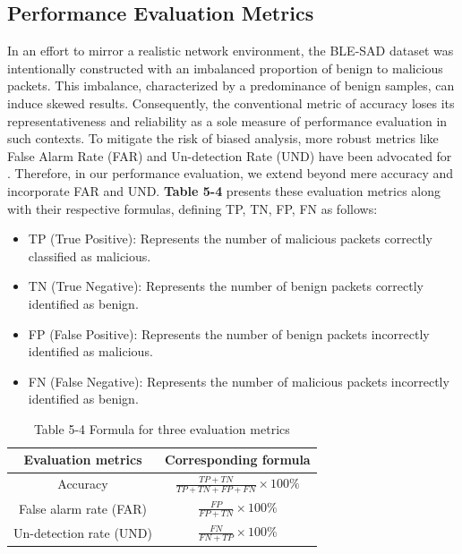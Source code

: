 

\subsection{Performance Evaluation Metrics}
\noindent In an effort to mirror a realistic network environment, the BLE-SAD dataset was intentionally constructed with an imbalanced proportion of benign to malicious packets. This imbalance, characterized by a predominance of benign samples, can induce skewed results. Consequently, the conventional metric of accuracy loses its representativeness and reliability as a sole measure of performance evaluation in such contexts. To mitigate the risk of biased analysis, more robust metrics like False Alarm Rate (FAR) and Un-detection Rate (UND) have been advocated for \cite{lahmadi2020mitm}. Therefore, in our performance evaluation, we extend beyond mere accuracy and incorporate FAR and UND. \textbf{Table 5-4} presents these evaluation metrics along with their respective formulas, defining TP, TN, FP, FN as follows:

\begin{itemize}[leftmargin=0.1cm]
    \setlength{\itemsep}{-0.1cm}
    \item TP (True Positive): Represents the number of malicious packets correctly classified as malicious.
    \item TN (True Negative): Represents the number of benign packets correctly identified as benign.
    \item FP (False Positive): Represents the number of benign packets incorrectly identified as malicious.
    \item FN (False Negative): Represents the number of malicious packets incorrectly identified as benign.
\end{itemize}


\begin{table}%
    \tabcolsep=0.96cm
    \renewcommand\arraystretch{1.56}
    \centering
    \caption*{Table 5-4 Formula for three evaluation metrics}
    \vspace{-4pt}
    \begin{tabular}{cc}
    \toprule[1pt]
        Evaluation metrics & Corresponding formula \\ \midrule[0.5pt]
        Accuracy & $\frac{T P+T N}{T P+T N+F P+F N} \times 100 \%$ \\
        False alarm rate (FAR) & $\frac{F P}{F P+T N} \times 100 \%$ \\
        Un-detection rate (UND) & $\frac{F N}{F N+T P} \times 100 \%$ \\
    \bottomrule[1pt]
    \end{tabular}
    \label{table5-4}
\end{table}


